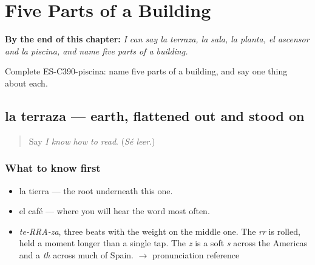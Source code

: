 
\chapter{Five Parts of a Building}
\label{ch:la-terraza-y-la-sala}

\begin{chapteropening}
\textbf{By the end of this chapter:} \emph{I can say la terraza, la sala, la planta, el ascensor and la piscina, and name five parts of a building.}

Complete ES-C390-piscina: name five parts of a building, and say one thing about each.
\end{chapteropening}

\section[la terraza]{la terraza — earth, flattened out and stood on}

\label{lesson:ES-C390-terraza}



\begin{quote}
Say \emph{I know how to read}. (\emph{Sé leer}.)
\end{quote}

\subsection*{What to know first}
\begin{itemize}
\raggedright
  \item la tierra — the root underneath this one.
  \item el café — where you will hear the word most often.
\end{itemize}

\begin{sounds}
\begin{itemize}
\raggedright
  \item \emph{te-RRA-za}, three beats with the weight on the middle one. The \emph{rr} is rolled, held a moment longer than a single tap. The \emph{z} is a soft \emph{s} across the Americas and a \emph{th} across much of Spain. $\to$ pronunciation reference
\end{itemize}
\end{sounds}

